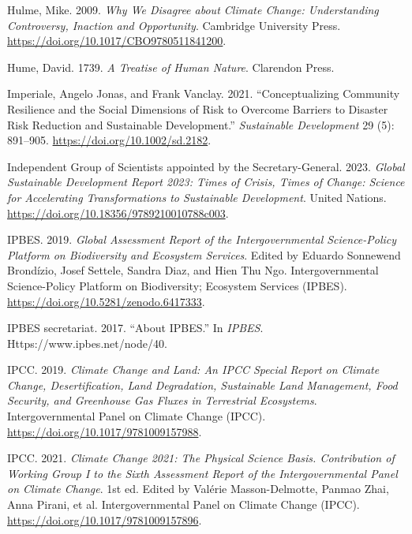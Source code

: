\documentclass[
  a4paper,
  DIV=11,
  numbers=noendperiod,
  oneside,
  openany]{scrreprt}
\newlength{\cslhangindent}
\newenvironment{CSLReferences}[2] %
 {\begin{list}{}{%
  \setlength{\itemindent}{0pt}
  \setlength{\leftmargin}{0pt}
  \setlength{\parsep}{0pt}
  \ifodd #1
   \setlength{\leftmargin}{\cslhangindent}
   \setlength{\itemindent}{-1\cslhangindent}
  \fi
  \setlength{\itemsep}{#2\baselineskip}}}
 {\end{list}}
\begin{document}
\begin{CSLReferences}{1}{1}
Hulme, Mike. 2009. \emph{Why {We Disagree} about {Climate Change}:
{Understanding Controversy}, {Inaction} and {Opportunity}}. Cambridge
University Press. \url{https://doi.org/10.1017/CBO9780511841200}.

Hume, David. 1739. \emph{A {Treatise} of {Human Nature}}. Clarendon
Press.

Imperiale, Angelo Jonas, and Frank Vanclay. 2021. {``Conceptualizing
Community Resilience and the Social Dimensions of Risk to Overcome
Barriers to Disaster Risk Reduction and Sustainable Development.''}
\emph{Sustainable Development} 29 (5): 891--905.
\url{https://doi.org/10.1002/sd.2182}.

Independent Group of Scientists appointed by the Secretary-General.
2023. \emph{Global {Sustainable Development Report} 2023: {Times} of
Crisis, Times of Change: {Science} for Accelerating Transformations to
Sustainable Development}. United Nations.
\url{https://doi.org/10.18356/9789210010788c003}.

IPBES. 2019. \emph{Global Assessment Report of the {Intergovernmental}
{Science}-{Policy} {Platform} on {Biodiversity} and {Ecosystem}
{Services}}. Edited by Eduardo Sonnewend Brondízio, Josef Settele,
Sandra Diaz, and Hien Thu Ngo. Intergovernmental Science-Policy Platform
on Biodiversity; Ecosystem Services (IPBES).
\url{https://doi.org/10.5281/zenodo.6417333}.

IPBES secretariat. 2017. {``About {IPBES}.''} In \emph{IPBES}.
Https://www.ipbes.net/node/40.

IPCC. 2019. \emph{Climate {Change} and {Land}: An {IPCC} Special Report
on Climate Change, Desertification, Land Degradation, Sustainable Land
Management, Food Security, and Greenhouse Gas Fluxes in Terrestrial
Ecosystems}. Intergovernmental Panel on Climate Change (IPCC).
\url{https://doi.org/10.1017/9781009157988}.

IPCC. 2021. \emph{Climate {Change} 2021: {The} {Physical} {Science}
{Basis}. {Contribution} of {Working} {Group} {I} to the {Sixth}
{Assessment} {Report} of the {Intergovernmental} {Panel} on {Climate}
{Change}}. 1st ed. Edited by Valérie Masson-Delmotte, Panmao Zhai, Anna
Pirani, et al. Intergovernmental Panel on Climate Change (IPCC).
\url{https://doi.org/10.1017/9781009157896}.


\end{CSLReferences}
\end{document}
